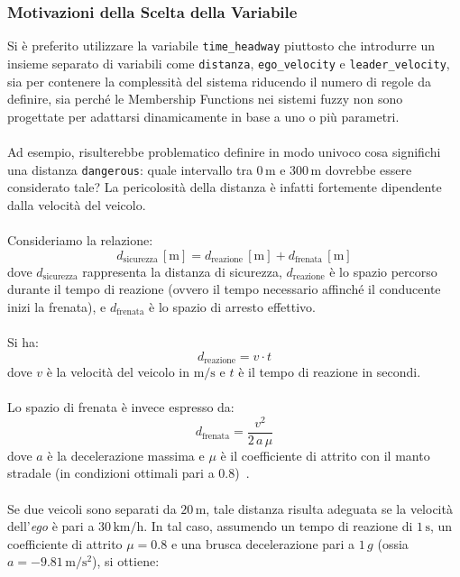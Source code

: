 \subsubsection{Motivazioni della Scelta della Variabile} 
\label{subsubsection:th_motivazione}
Si è preferito utilizzare la variabile \texttt{time\_headway} piuttosto che introdurre un insieme separato di variabili come 
\texttt{distanza}, \texttt{ego\_velocity} e \texttt{leader\_velocity}, sia per contenere la complessità del sistema riducendo 
il numero di regole da definire, sia perché le Membership Functions nei sistemi fuzzy non sono progettate per adattarsi 
dinamicamente in base a uno o più parametri.
\\\\
Ad esempio, risulterebbe problematico definire in modo univoco cosa significhi una distanza \texttt{dangerous}: quale intervallo 
tra \(0\,\mathrm{m}\) e \(300\,\mathrm{m}\) dovrebbe essere considerato tale? La pericolosità della distanza è infatti fortemente 
dipendente dalla velocità del veicolo.
\\\\
Consideriamo la relazione:
\begin{equation}
  d_{\mathrm{sicurezza}}\,[\mathrm{m}] = d_{\mathrm{reazione}}\,[\mathrm{m}] + d_{\mathrm{frenata}}\,[\mathrm{m}]
  \label{eq:d_sicurezza}
\end{equation}
\noindent dove \(d_{\mathrm{sicurezza}}\) rappresenta la distanza di sicurezza, \(d_{\mathrm{reazione}}\) è lo spazio percorso durante il tempo di reazione (ovvero il tempo necessario affinché il conducente inizi la frenata), e \(d_{\mathrm{frenata}}\) è lo spazio di arresto effettivo.
\\\\
Si ha:
\[
d_{\mathrm{reazione}} = v \cdot t
\]
dove \(v\) è la velocità del veicolo in \(\mathrm{m/s}\) e \(t\) è il tempo di reazione in secondi.
\\\\
Lo spazio di frenata è invece espresso da:
\[
d_{\mathrm{frenata}} = \frac{v^2}{2\,a\,\mu}
\]
dove \(a\) è la decelerazione massima e \(\mu\) è il coefficiente di attrito con il manto stradale (in condizioni ottimali pari a 0.8)~\cite{distanza_di_sicurezza_youmath}.
\\\\
Se due veicoli sono separati da \(20\,\mathrm{m}\), tale distanza risulta adeguata se la velocità 
dell'\emph{ego} è pari a \(30\,\mathrm{km/h}\). In tal caso, assumendo un tempo di reazione di \(1\,\mathrm{s}\), 
un coefficiente di attrito \(\mu=0.8\) e una brusca decelerazione pari a \(1\,g\) (ossia \(a = -9.81\,\mathrm{m/s^2}\)), si ottiene:
